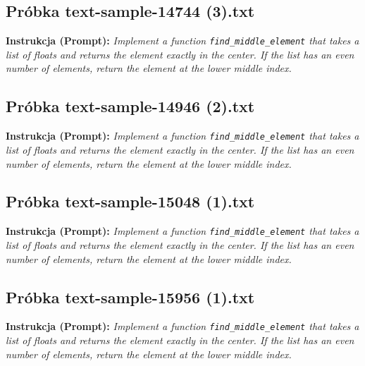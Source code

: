 \subsection{Próbka text-sample-14744 (3).txt}
\label{sec:lst:text-sample-14744-3}
\textbf{Instrukcja (Prompt):} \textit{Implement a function \texttt{find\_middle\_element} that takes a list of floats and returns the element exactly in the center. If the list has an even number of elements, return the element at the lower middle index.}




\subsection{Próbka text-sample-14946 (2).txt}
\label{sec:lst:text-sample-14946-2}
\textbf{Instrukcja (Prompt):} \textit{Implement a function \texttt{find\_middle\_element} that takes a list of floats and returns the element exactly in the center. If the list has an even number of elements, return the element at the lower middle index.}




\subsection{Próbka text-sample-15048 (1).txt}
\label{sec:lst:text-sample-15048-1}
\textbf{Instrukcja (Prompt):} \textit{Implement a function \texttt{find\_middle\_element} that takes a list of floats and returns the element exactly in the center. If the list has an even number of elements, return the element at the lower middle index.}




\subsection{Próbka text-sample-15956 (1).txt}
\label{sec:lst:text-sample-15956-1}
\textbf{Instrukcja (Prompt):} \textit{Implement a function \texttt{find\_middle\_element} that takes a list of floats and returns the element exactly in the center. If the list has an even number of elements, return the element at the lower middle index.}

